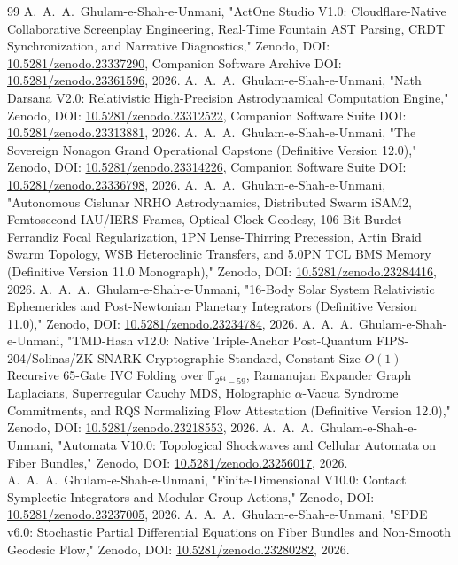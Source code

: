 \documentclass[11pt,a4paper,reqno]{article}
\theoremstyle{plain}
\theoremstyle{definition}
\theoremstyle{remark}
\numberwithin{equation}{section}
\begin{document}
\begin{thebibliography}{99}
 A.~A.~A.~Ghulam-e-Shah-e-Unmani, "ActOne Studio V1.0: Cloudflare-Native Collaborative Screenplay Engineering, Real-Time Fountain AST Parsing, CRDT Synchronization, and Narrative Diagnostics," Zenodo, DOI: \href{https://doi.org/10.5281/zenodo.23337290}{10.5281/zenodo.23337290}, Companion Software Archive DOI: \href{https://doi.org/10.5281/zenodo.23361596}{10.5281/zenodo.23361596}, 2026.
 A.~A.~A.~Ghulam-e-Shah-e-Unmani, "Nath Darsana V2.0: Relativistic High-Precision Astrodynamical Computation Engine," Zenodo, DOI: \href{https://doi.org/10.5281/zenodo.23312522}{10.5281/zenodo.23312522}, Companion Software Suite DOI: \href{https://doi.org/10.5281/zenodo.23313881}{10.5281/zenodo.23313881}, 2026.
 A.~A.~A.~Ghulam-e-Shah-e-Unmani, "The Sovereign Nonagon Grand Operational Capstone (Definitive Version 12.0)," Zenodo, DOI: \href{https://doi.org/10.5281/zenodo.23314226}{10.5281/zenodo.23314226}, Companion Software Suite DOI: \href{https://doi.org/10.5281/zenodo.23336798}{10.5281/zenodo.23336798}, 2026.
 A.~A.~A.~Ghulam-e-Shah-e-Unmani, "Autonomous Cislunar NRHO Astrodynamics, Distributed Swarm iSAM2, Femtosecond IAU/IERS Frames, Optical Clock Geodesy, 106-Bit Burdet-Ferrandiz Focal Regularization, 1PN Lense-Thirring Precession, Artin Braid Swarm Topology, WSB Heteroclinic Transfers, and 5.0PN TCL BMS Memory (Definitive Version 11.0 Monograph)," Zenodo, DOI: \href{https://doi.org/10.5281/zenodo.23284416}{10.5281/zenodo.23284416}, 2026.
 A.~A.~A.~Ghulam-e-Shah-e-Unmani, "16-Body Solar System Relativistic Ephemerides and Post-Newtonian Planetary Integrators (Definitive Version 11.0)," Zenodo, DOI: \href{https://doi.org/10.5281/zenodo.23234784}{10.5281/zenodo.23234784}, 2026.
 A.~A.~A.~Ghulam-e-Shah-e-Unmani, "TMD-Hash v12.0: Native Triple-Anchor Post-Quantum FIPS-204/Solinas/ZK-SNARK Cryptographic Standard, Constant-Size $O(1)$ Recursive 65-Gate IVC Folding over $\mathbb{F}_{2^{64}-59}$, Ramanujan Expander Graph Laplacians, Superregular Cauchy MDS, Holographic $\alpha$-Vacua Syndrome Commitments, and RQS Normalizing Flow Attestation (Definitive Version 12.0)," Zenodo, DOI: \href{https://doi.org/10.5281/zenodo.23218553}{10.5281/zenodo.23218553}, 2026.
 A.~A.~A.~Ghulam-e-Shah-e-Unmani, "Automata V10.0: Topological Shockwaves and Cellular Automata on Fiber Bundles," Zenodo, DOI: \href{https://doi.org/10.5281/zenodo.23256017}{10.5281/zenodo.23256017}, 2026.
 A.~A.~A.~Ghulam-e-Shah-e-Unmani, "Finite-Dimensional V10.0: Contact Symplectic Integrators and Modular Group Actions," Zenodo, DOI: \href{https://doi.org/10.5281/zenodo.23237005}{10.5281/zenodo.23237005}, 2026.
 A.~A.~A.~Ghulam-e-Shah-e-Unmani, "SPDE v6.0: Stochastic Partial Differential Equations on Fiber Bundles and Non-Smooth Geodesic Flow," Zenodo, DOI: \href{https://doi.org/10.5281/zenodo.23280282}{10.5281/zenodo.23280282}, 2026.
\end{thebibliography}
\end{document}
